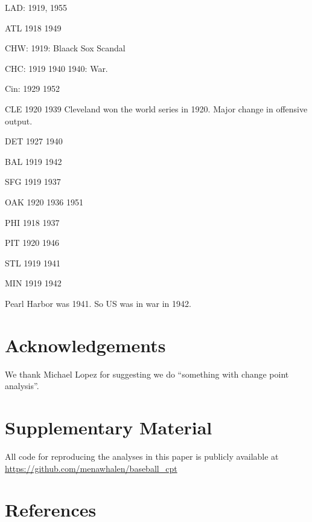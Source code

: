 \documentclass[
  12pt,
]{article}
\begin{document}
LAD: 1919, 1955

ATL 1918 1949

CHW: 1919: Blaack Sox Scandal

CHC: 1919 1940 1940: War.

Cin: 1929 1952

CLE 1920 1939 Cleveland won the world series in 1920. Major change in
offensive output.

DET 1927 1940

BAL 1919 1942

SFG 1919 1937

OAK 1920 1936 1951

PHI 1918 1937

PIT 1920 1946

STL 1919 1941

MIN 1919 1942

Pearl Harbor was 1941. So US was in war in 1942.

\hypertarget{acknowledgements}{%
\section*{Acknowledgements}\label{acknowledgements}}

We thank Michael Lopez for suggesting we do ``something with change
point analysis''.

\hypertarget{supplementary-material}{%
\section*{Supplementary Material}\label{supplementary-material}}

All code for reproducing the analyses in this paper is publicly
available at \url{https://github.com/menawhalen/baseball_cpt}

\hypertarget{references}{%
\section*{References}\label{references}}
\end{document}
